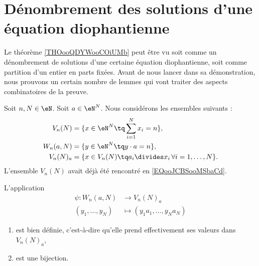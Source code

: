 \section{Dénombrement des solutions d'une équation diophantienne}

Le théorème \ref{THOooQDYWooCOiUMb} peut être vu soit comme un dénombrement de solutions d'une certaine équation diophantienne, soit comme partition d'un entier en parts fixées. Avant de nous lancer dans sa démonstration, nous prouvons un certain nombre de lemmes qui vont traiter des aspects combinatoires de la preuve.

Soit \( n,N\in \eN\). Soit \( a\in \eN^N\). Nous considérons les ensembles suivants :
\begin{subequations}
	\begin{align}
		V_n(N)   & =\{ x\in \eN^N\tq \sum_{i=1}^Nx_i=n \},                       \\
		W_n(a,N) & =\{ y\in \eN^N\tq y\cdot a=n \},                              \\
		V_n(N)_a & =\{ x\in V_n(N)\tq a_i\divides x_i\,\forall i=1,\ldots, N \}.
	\end{align}
\end{subequations}
L'ensemble \( V_n(N)\) avait déjà été rencontré en \eqref{EQooJCBSooMSbaCd}.

\begin{lemma}       \label{LEMooLKCAooCeDnSj}
	L'application
	\begin{equation}
		\begin{aligned}
			\psi\colon W_n(a,N) & \to V_n(N)_a                    \\
			(y_1,\ldots, y_N)   & \mapsto (y_1a_1,\ldots, y_Na_N)
		\end{aligned}
	\end{equation}
	\begin{enumerate}
		\item
		      est bien définie, c'est-à-dire qu'elle prend effectivement ses valeurs dans \( V_n(N)_a\),
		\item
		      est une bijection.
	\end{enumerate}
\end{lemma}

